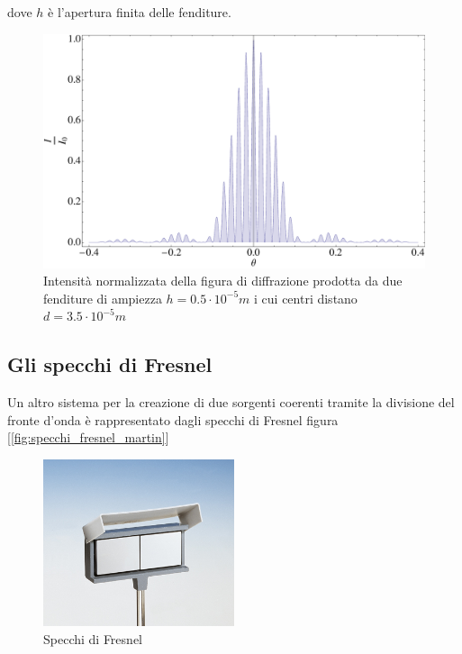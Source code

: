 \documentclass[a4paper,10pt,oneside]{article}
\begin{document}
dove $h$ è l'apertura finita delle fenditure.
\begin{figure}[H]
 \centering
 \includegraphics[width=\textwidth]{./Immagini/diffrazione.pdf}
 \caption{Intensità normalizzata della figura di diffrazione prodotta da due fenditure di ampiezza $h=0.5\cdot 10^{-5}m$ i cui centri distano $d=3.5\cdot 10^{-5}m$}
 \label{fig:int_duefenditure}
\end{figure}



\subsection{Gli specchi di Fresnel}

Un altro sistema per la creazione di due sorgenti coerenti tramite la divisione del fronte d'onda  è rappresentato dagli specchi di Fresnel figura [\ref{fig:specchi_fresnel_martin}]
\begin{figure}[H]
 \centering
 \includegraphics[width=0.5\textwidth]{./Immagini/08560_00.jpg}
 \caption{Specchi di Fresnel}
 \label{fig:specchi_fresnel_1}
\end{figure}
\end{document}
